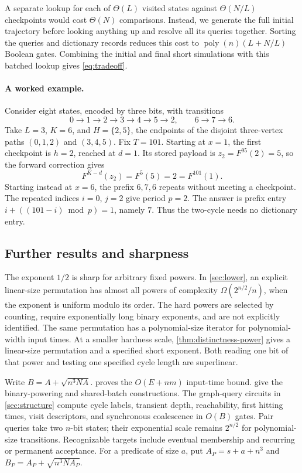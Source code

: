 \documentclass[11pt]{article}
\theoremstyle{definition}
\theoremstyle{remark}
\newcommand{\poly}{\operatorname{poly}}
\numberwithin{equation}{section}
\begin{document}
A separate lookup for each of $\Theta(L)$ visited states against
$\Theta(N/L)$ checkpoints would cost $\Theta(N)$ comparisons.  Instead,
we generate the full initial trajectory before looking anything up and
resolve all its queries together.  Sorting the queries and dictionary
records reduces this cost to
$\poly(n)(L+N/L)$ Boolean gates.  Combining the initial and final short
simulations with this batched lookup gives \cref{eq:tradeoff}.

\paragraph{A worked example.}
Consider eight states, encoded by three bits, with transitions
\[
  0\to1\to2\to3\to4\to5\to2,
  \qquad 6\to7\to6.
\]
Take $L=3$, $K=6$, and $H=\{2,5\}$, the endpoints of the disjoint
three-vertex paths $(0,1,2)$ and $(3,4,5)$.  Fix $T=101$.
Starting at $x=1$, the first checkpoint is $h=2$, reached at $d=1$.
Its stored payload is $z_2=F^{95}(2)=5$, so the forward correction gives
\[
  F^{K-d}(z_2)=F^5(5)=2=F^{101}(1).
\]
Starting instead at $x=6$, the prefix $6,7,6$ repeats without meeting a
checkpoint.  The repeated indices $i=0$, $j=2$ give period $p=2$.
The answer is prefix entry $i+((101-i)\bmod p)=1$, namely $7$.
Thus the two-cycle needs no dictionary entry.

\subsection{Further results and sharpness}

The exponent $1/2$ is sharp for arbitrary fixed powers.  In
\cref{sec:lower}, an explicit linear-size permutation has almost all powers
of complexity $\Omega(2^{n/2}/n)$, when the exponent is uniform modulo its
order.  The hard powers are selected by counting, require exponentially
long binary exponents, and are not explicitly identified.  The same
permutation has a polynomial-size iterator for polynomial-width input times.
At a smaller hardness scale, \cref{thm:distinctness-power} gives a
linear-size permutation and a specified short exponent. Both reading one
bit of that power and testing one specified cycle length are superlinear.

Write $B=A+\sqrt{n^3NA}$.   proves the
$O(E+nm)$ input-time bound.  give the
binary-powering and shared-batch constructions.  The graph-query circuits
in \cref{sec:structure} compute cycle labels, transient depth, reachability,
first hitting times, visit descriptors, and synchronous coalescence in
$O(B)$ gates.  Pair queries take two $n$-bit states; their exponential
scale remains $2^{n/2}$ for polynomial-size transitions.
Recognizable targets include eventual membership and recurring or permanent
acceptance.  For a predicate of size $a$, put $A_P=s+a+n^3$ and
$B_P=A_P+\sqrt{n^3NA_P}$.
\end{document}
